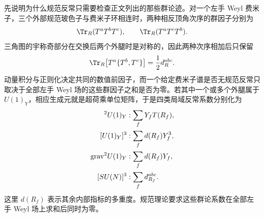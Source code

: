 \begin{derivation}
先说明为什么规范反常只需要检查正文列出的那些群论迹。对一个左手 Weyl 费米子，三个外部规范玻色子与费米子环相连时，两种相反顶角次序的群因子分别为
\begin{equation*}
 \Tr_R(T^aT^bT^c),
 \qquad
 \Tr_R(T^aT^cT^b).
\end{equation*}
三角图的宇称奇部分在交换后两个外腿时是对称的，因此两种次序相加后只保留
\begin{equation*}
 \Tr_R\!\left[T^a\{T^b,T^c\}\right]
 =\frac12d_R^{abc}.
\end{equation*}
动量积分与正则化决定共同的数值前因子，而一个给定费米子谱是否无规范反常只取决于全部左手 Weyl 场的这些群因子之和是否为零。若其中一个或多个外腿属于 $U(1)_Y$，相应生成元就是超荷乘单位矩阵，于是四类局域反常系数分别化为
\begin{align*}
 [SU(N)]^2U(1)_Y &: \sum_f Y_fT(R_f),\\
 [U(1)_Y]^3 &: \sum_f d(R_f)Y_f^3,\\
 {\rm grav}^2U(1)_Y &: \sum_f d(R_f)Y_f,\\
 [SU(N)]^3 &: \sum_f d_{R_f}^{abc}.
\end{align*}
这里 $d(R_f)$ 表示其余内部指标的多重度。规范理论要求这些群论系数在全部左手 Weyl 场上求和后同时为零。


\end{derivation}

